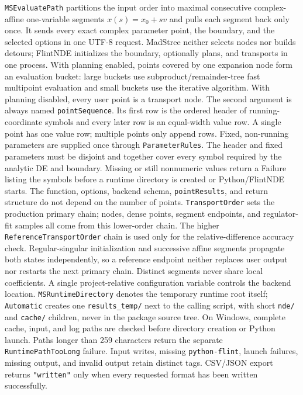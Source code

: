 \documentclass[11pt,a4paper]{article}
\begin{document}
\texttt{MSEvaluatePath} partitions the input order into maximal consecutive complex-affine
one-variable segments $x(s)=x_0+s v$ and pulls each segment back only once. It sends every
exact complex parameter point, the boundary, and the selected options in one UTF-8 request.
MadStree neither selects nodes nor builds detours; FlintNDE initializes the boundary, optionally
plans, and transports in one process. With planning enabled, points covered by one expansion
node form an evaluation bucket: large buckets use subproduct/remainder-tree fast multipoint
evaluation and small buckets use the iterative algorithm. With planning disabled, every user
point is a transport node. The second argument is always named \texttt{pointSequence}.
Its first row is the ordered header of running-coordinate symbols and every later row is an
equal-width value row. A single point has one value row; multiple points only append rows.
Fixed, non-running parameters are supplied once through \texttt{ParameterRules}. The header and
fixed parameters must be disjoint and together cover every symbol required by the analytic DE and
boundary. Missing or still nonnumeric values return a Failure listing the symbols before a runtime
directory is created or Python/FlintNDE starts. The function, options, backend schema,
\texttt{pointResults}, and return structure do not depend on the number of points.
\texttt{TransportOrder} sets the production primary chain; nodes,
dense points, segment endpoints, and regulator-fit samples all come from this lower-order chain.
The higher \texttt{ReferenceTransportOrder} chain is used only for the relative-difference accuracy
check. Regular-singular initialization and successive affine segments propagate both states
independently, so a reference endpoint neither replaces user output nor restarts the next primary
chain. Distinct segments never share local coefficients. A single
project-relative configuration variable controls the backend location.
\texttt{MSRuntimeDirectory} denotes the temporary runtime root itself; \texttt{Automatic}
creates one \texttt{results\_temp/} next to the calling script, with short \texttt{nde/} and
\texttt{cache/} children, never in the package source tree. On Windows, complete cache,
input, and log paths are checked before directory creation or Python launch. Paths longer
than 259 characters return the separate \texttt{RuntimePathTooLong} failure. Input writes,
missing \texttt{python-flint}, launch failures, missing output, and invalid output retain
distinct tags. CSV/JSON export returns \texttt{"written"} only when every requested format
has been written successfully.
\end{document}
